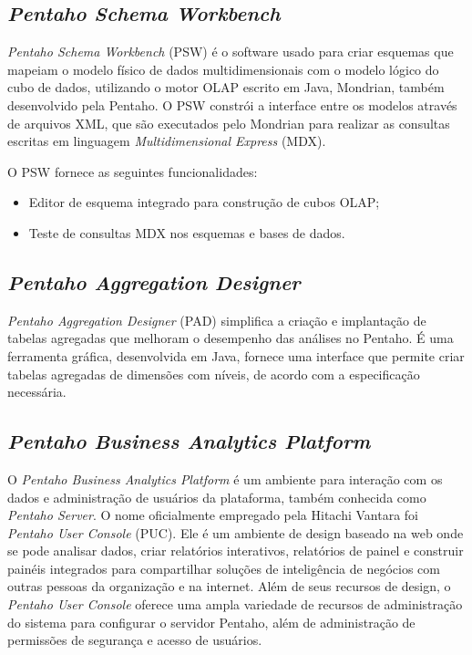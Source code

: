 \subsection{\textit{Pentaho Schema Workbench}}
\textit{Pentaho Schema Workbench} (PSW) é o software usado para criar esquemas que mapeiam o modelo físico de dados multidimensionais com o modelo lógico do cubo de dados, utilizando o motor OLAP escrito em Java, Mondrian, também desenvolvido pela Pentaho. O PSW constrói a interface entre os modelos através de arquivos XML, que são executados pelo Mondrian para realizar as consultas escritas em linguagem \textit{Multidimensional Express} (MDX).

O PSW fornece as seguintes funcionalidades:

\begin{itemize}
    \item Editor de esquema integrado para construção de cubos OLAP;
    \item Teste de consultas MDX nos esquemas e bases de dados.
\end{itemize}

\subsection{\textit{Pentaho Aggregation Designer}}
\textit{Pentaho Aggregation Designer} (PAD) simplifica a criação e implantação de tabelas agregadas que melhoram o desempenho das análises no Pentaho. É uma ferramenta gráfica, desenvolvida em Java, fornece uma interface que permite criar tabelas agregadas de dimensões com níveis, de acordo com a especificação necessária.

\subsection{\textit{Pentaho Business Analytics Platform}}
O \textit{Pentaho Business Analytics Platform} é um ambiente para interação com os dados e administração de usuários da plataforma, também conhecida como \textit{Pentaho Server}. O nome oficialmente empregado pela Hitachi Vantara foi \textit{Pentaho User Console} (PUC). Ele é um ambiente de design baseado na web onde se pode analisar dados, criar relatórios interativos, relatórios de painel e construir painéis integrados para compartilhar soluções de inteligência de negócios com outras pessoas da organização e na internet. Além de seus recursos de design, o \textit{Pentaho User Console} oferece uma ampla variedade de recursos de administração do sistema para configurar o servidor Pentaho, além de administração de permissões de segurança e acesso de usuários.

